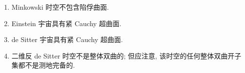 \begin{description}[font=\normalfont,leftmargin=2em,labelwidth=1.5em]
\begin{enumerate}[label=(\alph*),ref=\alph*,leftmargin=*]
\item Minkowski 时空不包含陷俘曲面.
\item Einstein 宇宙具有紧 Cauchy 超曲面.
\item de Sitter 宇宙具有紧 Cauchy 超曲面.
\item 二维反 de Sitter 时空不是整体双曲的; 但应注意, 该时空的任何整体双曲开子集都不是测地完备的.
\end{enumerate}
\end{description}
